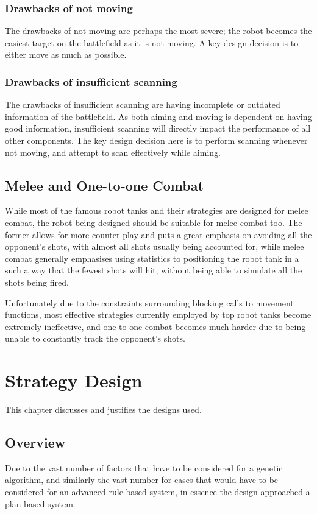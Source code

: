 \documentclass[11pt]{report}
\begin{document}
\subsection{Drawbacks of not moving}
The drawbacks of not moving are perhaps the most severe; the robot becomes the easiest target on the battlefield as it is not moving. A key design decision is to either move as much as possible.

\subsection{Drawbacks of insufficient scanning}
The drawbacks of insufficient scanning are having incomplete or outdated information of the battlefield. As both aiming and moving is dependent on having good information, insufficient scanning will directly impact the performance of all other components. The key design decision here is to perform scanning whenever not moving, and attempt to scan effectively while aiming.

\section{Melee and One-to-one Combat}
While most of the famous robot tanks and their strategies are designed for melee combat, the robot being designed should be suitable for melee combat too. The former allows for more counter-play and puts a great emphasis on avoiding all the opponent's shots, with almost all shots usually being accounted for, while melee combat generally emphasises using statistics to positioning the robot tank in a such a way that the fewest shots will hit, without being able to simulate all the shots being fired.

Unfortunately due to the constraints surrounding blocking calls to movement functions, most effective strategies currently employed by top robot tanks become extremely ineffective, and one-to-one combat becomes much harder due to being unable to constantly track the opponent's shots.


\chapter{Strategy Design} %
This chapter discusses and justifies the designs used.

\section{Overview}
Due to the vast number of factors that have to be considered for a genetic algorithm, and similarly the vast number for cases that would have to be considered for an advanced rule-based system, in essence the design approached a plan-based system.
\end{document}
